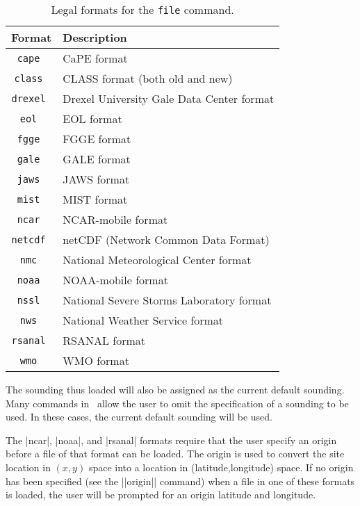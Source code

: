 \begin{table}[tp]
	\begin{center}
	\begin{tabular}{|c|l|}
		\hline
		Format		& Description \\
		\hline \hline
		\tt cape	& CaPE format \\
		\tt class	& CLASS format (both old and new) \\
    \tt drexel  & Drexel University Gale Data Center format \\
    \tt eol   & EOL format \\
		\tt fgge	& FGGE format \\
		\tt gale	& GALE format \\
		\tt jaws	& JAWS format \\
		\tt mist	& MIST format \\
		\tt ncar	& NCAR-mobile format \\
		\tt netcdf	& netCDF (Network Common Data Format) \\
		\tt nmc		& National Meteorological Center format \\
		\tt noaa	& NOAA-mobile format \\
		\tt nssl	& National Severe Storms Laboratory format \\
		\tt nws		& National Weather Service format\\
		\tt rsanal	& RSANAL format \\
    \tt wmo		& WMO format \\ \hline
	\end{tabular}
	\end{center}
	\caption{Legal formats for the {\tt file} command.}
	\label{tbl-formats}
\end{table}

The sounding thus loaded will also be assigned as the current
default sounding.  Many commands in \suds\ allow the user to omit the 
specification of a sounding to be used.  In these cases, the current default
sounding will be used.

The |ncar|, |noaa|, and |rsanal| formats require that the user specify an
origin before a file of that format can be loaded.  The origin is used to
convert the site location in $(x,y)$ space into a location in
(latitude,longitude) space.  If no origin has been specified (see the
||origin|| command) when a file in one of these formats is loaded, the user 
will be prompted for an origin latitude and longitude.

